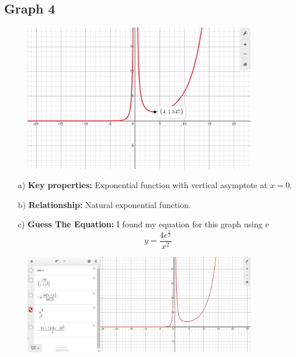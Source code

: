 \documentclass{article}
\begin{document}
\subsection{Graph 4}
\begin{figure}[h]
    \centering
    \includegraphics[width=0.9\textwidth]{imgs/imgs FSE/g_4.png}
    \label{fig:image}
\end{figure}
\begin{enumerate}
    \item[a)] \textbf{Key properties:} Exponential function with vertical asymptote at $x = 0$.
    \item[b)]  \textbf{Relationship:} Natural exponential function.
    \item[c)] \textbf{Guess The Equation: } I found my equation for this graph using e \smiley{} $$y=\frac{4e^{\frac{x}{2}}}{x^{2}}$$
\end{enumerate}
\begin{figure}[h]
    \centering
    \includegraphics[width=0.9\textwidth]{imgs/imgs FSE/4e^x_2_x^2.png}
    \label{fig:image}
\end{figure}
\newpage 
\end{document}
